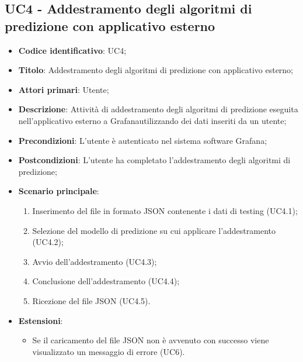 \subsection{UC4 - Addestramento degli algoritmi di predizione con applicativo esterno}
\begin{itemize}
    \item \textbf{Codice identificativo}: UC4;
    \item \textbf{Titolo}: Addestramento degli algoritmi di predizione con applicativo esterno;
    \item \textbf{Attori primari}: Utente;
    \item \textbf{Descrizione}: Attività di addestramento degli algoritmi di predizione eseguita nell'applicativo esterno a Grafana\glosp utilizzando dei dati inseriti da un utente;
    \item \textbf{Precondizioni}: L'utente è autenticato nel sistema software Grafana\glo;
    \item \textbf{Postcondizioni}: L'utente ha completato l'addestramento degli algoritmi di predizione;
    \item \textbf{Scenario principale}: 
        \begin{enumerate}
            \item Inserimento del file in formato JSON contenente i dati di testing (UC4.1);
            \item Selezione del modello di predizione su cui applicare l'addestramento (UC4.2);
            \item Avvio dell'addestramento (UC4.3);
            \item Conclusione dell'addestramento (UC4.4);
            \item Ricezione del file JSON (UC4.5). 
        \end{enumerate}
    \item \textbf{Estensioni}:
    \begin{itemize}
    	\item Se il caricamento del file JSON non è avvenuto con successo viene visualizzato un messaggio di errore (UC6).
    \end{itemize}
\end{itemize}

